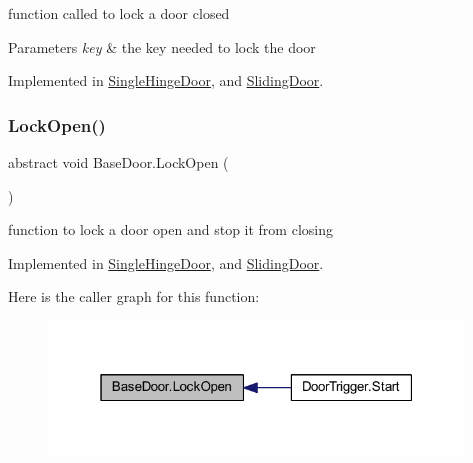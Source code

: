 function called to lock a door closed 


\begin{DoxyParams}{Parameters}
{\em key} & the key needed to lock the door\\
\hline
\end{DoxyParams}


Implemented in \mbox{\hyperlink{class_single_hinge_door_a329ff33388675ec531996bdb33dd0c70}{Single\+Hinge\+Door}}, and \mbox{\hyperlink{class_sliding_door_a2b21b6ea3181ac95520e0490c900d1a6}{Sliding\+Door}}.

\mbox{\label{class_base_door_a9a851525c3b6e878bec459992ac75408}} 
\subsubsection{\texorpdfstring{Lock\+Open()}{LockOpen()}}
{\footnotesize\ttfamily abstract void Base\+Door.\+Lock\+Open (\begin{DoxyParamCaption}{ }\end{DoxyParamCaption})\hspace{0.3cm}{\ttfamily [pure virtual]}}



function to lock a door open and stop it from closing 



Implemented in \mbox{\hyperlink{class_single_hinge_door_aea7072ec0a9ea4fc80f24dc400681478}{Single\+Hinge\+Door}}, and \mbox{\hyperlink{class_sliding_door_aca96469919dc50b5b3cc77cd6f4fc7d2}{Sliding\+Door}}.

Here is the caller graph for this function\+:
\nopagebreak
\begin{figure}[H]
\begin{center}
\leavevmode
\includegraphics[width=313pt]{class_base_door_a9a851525c3b6e878bec459992ac75408_icgraph}
\end{center}
\end{figure}
\mbox{\label{class_base_door_a3ce14aa6aca622f9d18e7054e76ec8d2}} 
